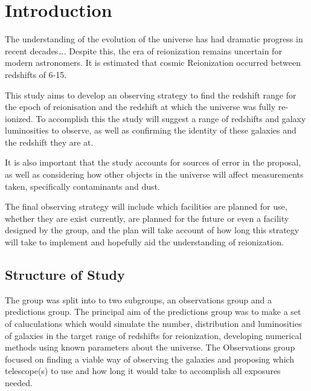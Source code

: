 
\section{Introduction} %
\label{section:Introduction}
	The understanding of the evolution of the universe has had dramatic progress in recent decades\ldots. Despite this, the era of reionization remains uncertain for modern astronomers. It is estimated that cosmic Reionization occurred between redshifts of 6-15. 

	This study aims to develop an observing strategy to find the redshift range for the epoch of reionisation and the redshift at which the universe was fully re-ionized. To accomplish this the study will suggest a range of redshifts and galaxy luminosities to observe, as well as confirming the identity of these galaxies and the redshift they are at. 

	It is also important that the study accounts for sources of error in the proposal, as well as considering how other objects in the universe will affect measurements taken, specifically contaminants and dust.

	The final observing strategy will include which facilities are planned for use, whether they are exist currently, are planned for the future or even a facility designed by the group, and the plan will take account of how long this strategy will take to implement and hopefully aid the understanding of reionization.

    \subsection{Structure of Study} %
    \label{Structure_of_Study}
		The group was split into to two subgroups, an observations group and a predictions group. The principal aim of the predictions group was to make a set of caluculations which would simulate the number, distribution and luminosities of galaxies in the target range of redshifts for reionization, developing numerical methods using known parameters about the universe. The Observations group focused on finding  a viable way of observing the galaxies and proposing which telescope(s) to use and how long it would take to accomplish all exposures needed.

